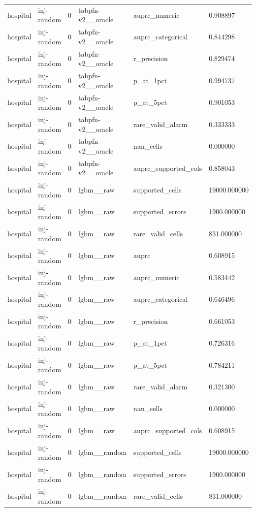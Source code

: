 \begin{tabular}{llllll}
hospital & inj-random & 0 & tabpfn-v2\_\_oracle & auprc\_numeric & 0.908897 \\
hospital & inj-random & 0 & tabpfn-v2\_\_oracle & auprc\_categorical & 0.844298 \\
hospital & inj-random & 0 & tabpfn-v2\_\_oracle & r\_precision & 0.829474 \\
hospital & inj-random & 0 & tabpfn-v2\_\_oracle & p\_at\_1pct & 0.994737 \\
hospital & inj-random & 0 & tabpfn-v2\_\_oracle & p\_at\_5pct & 0.901053 \\
hospital & inj-random & 0 & tabpfn-v2\_\_oracle & rare\_valid\_alarm & 0.333333 \\
hospital & inj-random & 0 & tabpfn-v2\_\_oracle & nan\_cells & 0.000000 \\
hospital & inj-random & 0 & tabpfn-v2\_\_oracle & auprc\_supported\_cols & 0.858043 \\
hospital & inj-random & 0 & lgbm\_\_raw & supported\_cells & 19000.000000 \\
hospital & inj-random & 0 & lgbm\_\_raw & supported\_errors & 1900.000000 \\
hospital & inj-random & 0 & lgbm\_\_raw & rare\_valid\_cells & 831.000000 \\
hospital & inj-random & 0 & lgbm\_\_raw & auprc & 0.608915 \\
hospital & inj-random & 0 & lgbm\_\_raw & auprc\_numeric & 0.583442 \\
hospital & inj-random & 0 & lgbm\_\_raw & auprc\_categorical & 0.646496 \\
hospital & inj-random & 0 & lgbm\_\_raw & r\_precision & 0.661053 \\
hospital & inj-random & 0 & lgbm\_\_raw & p\_at\_1pct & 0.726316 \\
hospital & inj-random & 0 & lgbm\_\_raw & p\_at\_5pct & 0.784211 \\
hospital & inj-random & 0 & lgbm\_\_raw & rare\_valid\_alarm & 0.321300 \\
hospital & inj-random & 0 & lgbm\_\_raw & nan\_cells & 0.000000 \\
hospital & inj-random & 0 & lgbm\_\_raw & auprc\_supported\_cols & 0.608915 \\
hospital & inj-random & 0 & lgbm\_\_random & supported\_cells & 19000.000000 \\
hospital & inj-random & 0 & lgbm\_\_random & supported\_errors & 1900.000000 \\
hospital & inj-random & 0 & lgbm\_\_random & rare\_valid\_cells & 831.000000 \\

\end{tabular}
